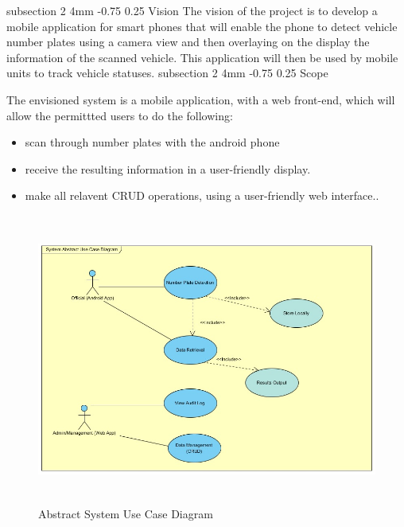 \documentclass[12pt]{article}
\makeatletter
\renewcommand{\subsection}{\@startsection
   {subsection}%
   {2}%
   {4mm}%
   {-0.75\baselineskip}%
   {0.25\baselineskip}%
   {\rmfamily\normalfont\scshape\normalsize}}%
\makeatother
\begin{document}
                		\subsection{Vision}
                				The vision of the project is to develop a mobile application for smart phones that will enable the phone to detect vehicle number plates using a camera view and then overlaying on the display the information of the scanned vehicle. This application will then be used by mobile units to track vehicle statuses. 
                		\subsection{Scope}
                			
                				The envisioned system is a mobile application, with a web front-end, which will allow the permittted users to do the following:
                			    		\begin{itemize}
                								\item scan through number plates with the android phone
                				                \item receive the resulting information in a user-friendly display.
                				                \item make all relavent CRUD operations, using a user-friendly web interface..
                				                
                			            \end{itemize}
                			            
           						\begin{figure}[h]
			           				\centering
			           				\includegraphics[width=5.51in, height=3.77in]{Pictures/AbstractUseCase.jpg}
			           				\caption{Abstract System Use Case Diagram}
           						\end{figure}
                				\FloatBarrier
                				
\end{document}

